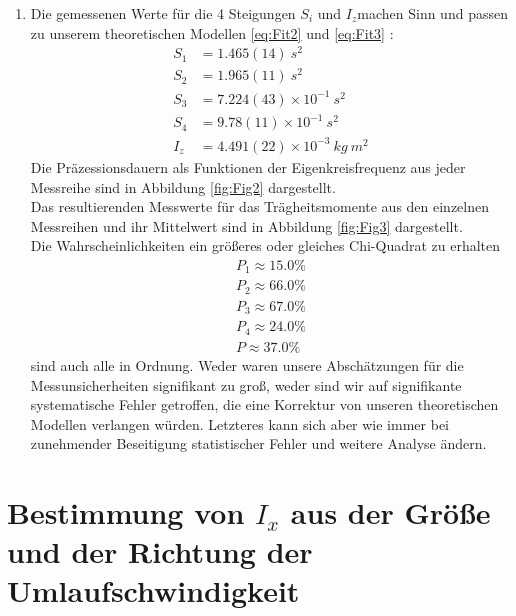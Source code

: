\documentclass[a4paper,10pt]{article}
\begin{document}
\begin{enumerate}[label=(\alph*)]
\boldmath
\item
Die gemessenen Werte für die 4 Steigungen \(S_i\) und \(I_z\)machen Sinn und passen zu unserem theoretischen Modellen \eqref{eq:Fit2} und \eqref{eq:Fit3} :
\begin{align*}
S_1&=1.465(14)\: s^2\\
S_2&=1.965(11)\: s^2\\
S_3&=7.224(43)\times10^{-1}\: s^2\\
S_4&=9.78(11)\times10^{-1}\: s^2\\
I_z &=4.491(22)\times10^{-3}\: kg\: m^2
\end{align*}
Die Präzessionsdauern als Funktionen der Eigenkreisfrequenz aus jeder Messreihe sind in Abbildung \ref{fig:Fig2} dargestellt.\\
Das resultierenden Messwerte für das Trägheitsmomente aus den einzelnen Messreihen und ihr Mittelwert sind in Abbildung \ref{fig:Fig3} dargestellt.\\
Die Wahrscheinlichkeiten ein größeres oder gleiches Chi-Quadrat zu erhalten
\begin{align*}
P_1\approx  15.0 \%\\
P_2\approx  66.0 \%\\
P_3\approx  67.0 \%\\
P_4\approx  24.0 \%\\
 P \approx 37.0 \%
\end{align*} sind auch alle in Ordnung. Weder waren unsere Abschätzungen für die Messunsicherheiten signifikant zu groß, weder sind wir auf signifikante systematische Fehler getroffen, die eine Korrektur von unseren theoretischen Modellen verlangen würden. Letzteres kann sich aber wie immer bei zunehmender Beseitigung statistischer Fehler und weitere Analyse ändern.



\end{enumerate}
\section{Bestimmung von \(I_{x}\) aus der Größe und der Richtung der Umlaufschwindigkeit}
\end{document}
